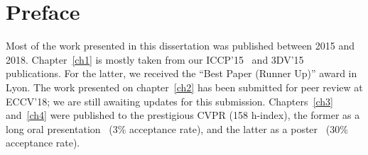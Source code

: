 \chapter*{Preface}         %

Most of the work presented in this dissertation was published between 2015 and 2018. Chapter~\ref{ch1} is mostly taken from our ICCP'15~\cite{holdgeoffroy-iccp-15} and 3DV'15~\cite{holdgeoffroy-3dv-15} publications. For the latter, we received the ``Best Paper (Runner Up)'' award in Lyon. The work presented on chapter~\ref{ch2} has been submitted for peer review at ECCV'18; we are still awaiting updates for this submission. Chapters~\ref{ch3} and~\ref{ch4} were published to the prestigious CVPR (158 h-index), the former as a long oral presentation~\cite{holdgeoffroy-cvpr-17} (3\% acceptance rate), and the latter as a poster~\cite{holdgeoffroy-cvpr-18} (30\% acceptance rate).



